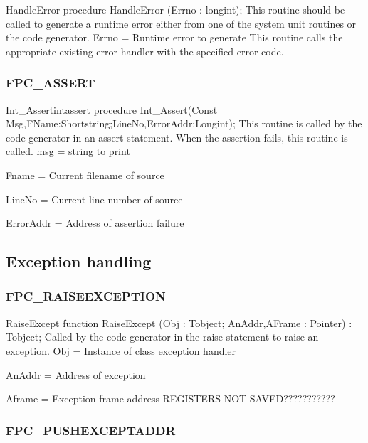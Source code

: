 \documentclass [a4paper,12pt]{article}
\begin{document}
\begin{procedure}{HandleError}
\Declaration
procedure HandleError (Errno : longint);
\Description
This routine should be called to generate a runtime error either from one of
the system unit routines or the code generator.
\Parameters
Errno = Runtime error to generate
\Notes
This routine calls the appropriate existing error handler with the specified
error code.
\Algorithm
\end{procedure}

\subsubsection{FPC{\_}ASSERT}
\label{subsubsec:mylabel59}

\begin{procedurel}{Int{\_}Assert}{intassert}
\Declaration
procedure Int{\_}Assert(Const Msg,FName:Shortstring;LineNo,ErrorAddr:Longint);
\Description
This routine is called by the code generator in an assert statement. When
the assertion fails, this routine is called.
\Parameters 
msg = string to print  \par
Fname = Current filename of source \par
LineNo = Current line number of source \par
ErrorAddr = Address of assertion failure
\end{procedurel}

\subsection{Exception handling}
\label{subsec:exception}

\subsubsection{FPC{\_}RAISEEXCEPTION}
\label{subsubsec:mylabel60}

\begin{function}{RaiseExcept}
\Declaration
function RaiseExcept (Obj : Tobject; AnAddr,AFrame : Pointer) : Tobject;
\Description
Called by the code generator in the raise statement to raise an exception. 
\Parameters
Obj = Instance of class exception handler \par
AnAddr = Address of exception \par
Aframe = Exception frame address
\Notes
REGISTERS NOT SAVED???????????
\end{function}

\subsubsection{FPC{\_}PUSHEXCEPTADDR}
\label{subsubsec:mylabel61}
\end{document}
